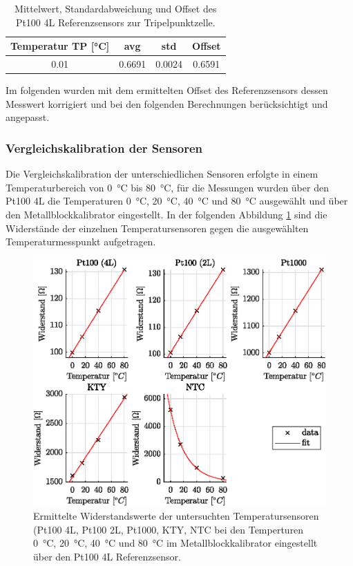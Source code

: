 \begin{table}[H]
	\centering
	\caption{Mittelwert, Standardabweichung und Offset des Pt100 4L Referenzsensors zur Tripelpunktzelle.}
	\label{tab:VergleichTPZ}
	\begin{tabular}{cccc}
		Temperatur TP [\si{\celsius}] & avg & std & Offset \\ 
		\hline 
		\num{0.01} & \num{0.6691} & \num{0.0024} &  \num{0.6591}\\ 
	\end{tabular} 
\end{table}


Im folgenden wurden mit dem ermittelten Offset des Referenzsensors dessen Messwert korrigiert und bei den folgenden Berechnungen berücksichtigt und angepasst. 

\subsubsection{Vergleichskalibration der Sensoren}

Die Vergleichskalibration der unterschiedlichen Sensoren erfolgte in einem Temperaturbereich von \SI{0}{\celsius} bis \SI{80}{\celsius}, für die Messungen wurden über den Pt100 4L die Temperaturen \SI{0}{\celsius}, \SI{20}{\celsius}, \SI{40}{\celsius} und \SI{80}{\celsius} ausgewählt und über den Metallblockkalibrator eingestellt. In der folgenden Abbildung \ref{fig:Widerstand} sind die Widerstände der einzelnen Temperatursensoren gegen die ausgewählten Temperaturmesspunkt aufgetragen. 

\begin{figure}[H]
	\centering
	\includegraphics[height=0.5\textheight]{../MLAB/Widerstandsgeraden.eps}
	\caption[Ermittelte Widerstandswerte der untersuchten Temperatursensoren ]{Ermittelte Widerstandswerte der untersuchten Temperatursensoren (Pt100 4L, Pt100 2L, Pt1000, KTY, NTC bei den Temperturen \SI{0}{\celsius}, \SI{20}{\celsius}, \SI{40}{\celsius} und \SI{80}{\celsius} im Metallblockkalibrator eingestellt über den Pt100 4L Referenzsensor. }
	\label{fig:Widerstand}
\end{figure}

